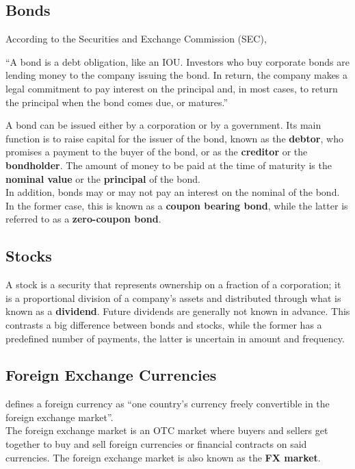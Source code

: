 \documentclass[../TGMAFFIRO]{subfiles}
\begin{document}
\subsection{Bonds}

According to the Securities and Exchange Commission (SEC),
\begin{displayquote}
``A bond is a debt obligation, like an IOU. Investors who buy corporate bonds are lending money to the company issuing the bond. In return, the company makes a legal commitment to pay interest on the principal and, in most cases, to return the principal when the bond comes due, or matures.''
\end{displayquote}

A bond can be issued either by a corporation or by a government. Its main function is to raise capital for the issuer of the bond, known as the \textbf{debtor}, who promises a payment to the buyer of the bond, or as the \textbf{creditor} or the \textbf{bondholder}. The amount of money to be paid at the time of maturity is the \textbf{nominal value} or the \textbf{principal} of the bond.\\

In addition, bonds may or may not pay an interest on the nominal of the bond. In the former case, this is known as a \textbf{coupon bearing bond}, while the latter is referred to as a \textbf{zero-coupon bond}.

\subsection{Stocks}
A stock is a security that represents ownership on a fraction of a corporation; it is a proportional division of a company's assets and distributed through what is known as a \textbf{dividend}. Future dividends are generally not known in advance. This contrasts a big difference between bonds and stocks, while the former has a predefined number of payments, the latter is uncertain in amount and frequency.

\subsection{Foreign Exchange Currencies}
 defines a foreign currency as ``one country's currency freely convertible in the foreign exchange market''.\\

The foreign exchange market is an OTC market where buyers and sellers get together to buy and sell foreign currencies or financial contracts on said currencies. The foreign exchange market is also known as the \textbf{FX market}.
\end{document}
